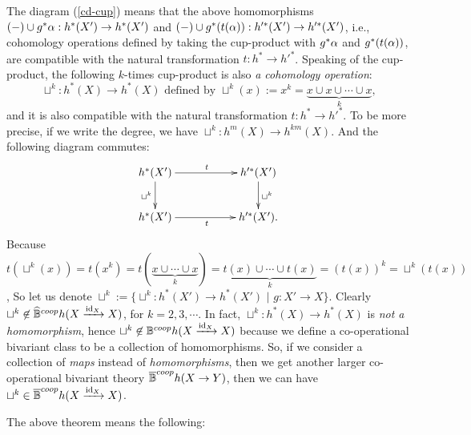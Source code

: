 \documentclass[a4paper]{amsart}
\begin{document}
\begin{rem} The diagram (\ref{cd-cup}) means that the above homomorphisms $ (-) \cup g^*\alpha: h^*(X') \to h^*(X')$ and  $ (-) \cup g^*(t(\alpha)): h'^*(X') \to h'^*(X')$, i.e., cohomology operations defined by taking the cup-product with $g^*\alpha$ and $g^*(t(\alpha))$, are compatible with the natural transformation $t:h^* \to h'^*$. Speaking of the cup-product, the following $k$-times cup-product is also \emph{a cohomology operation}:
$$\text{$\sqcup^k:h^*(X) \to h^*(X)$ defined by $\sqcup^k(x):=x^k = \underbrace{x \cup x \cup \cdots \cup x}_k$,}$$
and it is also compatible with the natural transformation $t:h^* \to h'^*$.
To be more precise, if we write the degree, we have $\sqcup^k:h^m(X) \to h^{km}(X)$.
And the following diagram commutes:
\begin{equation}\label{sq-cup}
\xymatrix
{
h^*(X') \ar[rr]^t \ar[d]_{\sqcup^k} && h'^*(X') \ar[d]^{\sqcup^k} \\
h^*(X')\ar[rr]_{t} && h'^*(X').
}
\end{equation}
Because $t(\sqcup^k(x)) =t(x^k)= t(\underbrace{x \cup \cdots \cup x}_k) = \underbrace{t(x) \cup \cdots \cup t(x)}_k =(t(x))^k =\sqcup^k(t(x))$,
So let us denote 
$\sqcup^k:=\{\sqcup^k:h^*(X') \to h^*(X') \, \, | \, \, g:X' \to X \}.$
Clearly $\sqcup^k \not \in \widehat{\mathbb B}^{coop}h(X \xrightarrow {\operatorname{id}_X} X)$, for $k=2, 3, \cdots$.
In fact, $\sqcup^k:h^*(X) \to h^*(X)$ is \emph{not a homomorphism}, hence $\sqcup^k \not \in \mathbb B^{coop}h(X \xrightarrow {\operatorname{id}_X} X)$
because we define a co-operational bivariant class to be a collection of homomorphisms. So, if we consider a collection of \emph{maps} instead of \emph{homomorphisms}, then we get another larger co-operational bivariant theory $\overline{\mathbb B}^{coop}h(X \to Y)$, then we can have 
$\sqcup^k \in \overline{\mathbb B}^{coop}h(X \xrightarrow {\operatorname{id}_X} X)$. 
\end{rem}
The above theorem means the following:
\end{document}
